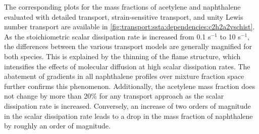 
The corresponding plots for the mass fractions of acetylene and naphthalene evaluated with detailed transport, strain-sensitive transport, and unity Lewis number transport are available in \cref{fig:transport:ssta:dependencies:c2h2a2vschist}. As the stoichiometric scalar dissipation rate is increased from 0.1 s$^{-1}$ to 10 s$^{-1}$, the differences between the various transport models are generally magnified for both species. This is explained by the thinning of the flame structure, which intensifies the effects of molecular diffusion at high scalar dissipation rates. The abatement of gradients in all naphthalene profiles over mixture fraction space further confirms this phenomenon. Additionally, the acetylene mass fraction does not change by more than 20\% for any transport approach as the scalar dissipation rate is increased. Conversely, an increase of two orders of magnitude in the scalar dissipation rate leads to a drop in the mass fraction of naphthalene by roughly an order of magnitude.


